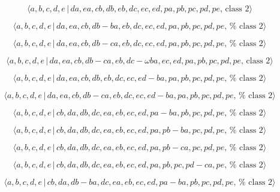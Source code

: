 \documentclass[10pt]{article}
\begin{document}
\begin{equation}
\langle a,b,c,d,e\,|\,da,ea,cb,db,eb,dc,ec,ed,pa,pb,pc,pd,pe,\,\text{class }%
2\rangle  \tag{7.4590}
\end{equation}

\begin{equation}
\langle a,b,c,d,e\,|\,da,ea,cb,db-ba,eb,dc,ec,ed,pa,pb,pc,pd,pe,\,\text{%
class }2\rangle  \tag{7.4591}
\end{equation}

\begin{equation}
\langle a,b,c,d,e\,|\,da,ea,cb,db-ca,eb,dc,ec,ed,pa,pb,pc,pd,pe,\,\text{%
class }2\rangle  \tag{7.4592}
\end{equation}

\begin{equation}
\langle a,b,c,d,e\,|\,da,ea,cb,db-ca,eb,dc-\omega ba,ec,ed,pa,pb,pc,pd,pe,\,%
\text{class }2\rangle  \tag{7.4593}
\end{equation}

\begin{equation}
\langle a,b,c,d,e\,|\,da,ea,cb,db,eb,dc,ec,ed-ba,pa,pb,pc,pd,pe,\,\text{%
class }2\rangle  \tag{7.4594}
\end{equation}

\begin{equation}
\langle a,b,c,d,e\,|\,da,ea,cb,db-ca,eb,dc,ec,ed-ba,pa,pb,pc,pd,pe,\,\text{%
class }2\rangle  \tag{7.4595}
\end{equation}

\begin{equation}
\langle a,b,c,d,e\,|\,cb,da,db,dc,ea,eb,ec,ed,pa-ba,pb,pc,pd,pe,\,\text{%
class }2\rangle  \tag{7.4596}
\end{equation}

\begin{equation}
\langle a,b,c,d,e\,|\,cb,da,db,dc,ea,eb,ec,ed,pa,pb-ba,pc,pd,pe,\,\text{%
class }2\rangle  \tag{7.4597}
\end{equation}

\begin{equation}
\langle a,b,c,d,e\,|\,cb,da,db,dc,ea,eb,ec,ed,pa,pb-ca,pc,pd,pe,\,\text{%
class }2\rangle  \tag{7.4598}
\end{equation}

\begin{equation}
\langle a,b,c,d,e\,|\,cb,da,db,dc,ea,eb,ec,ed,pa,pb,pc,pd-ca,pe,\,\text{%
class }2\rangle  \tag{7.4599}
\end{equation}

\begin{equation}
\langle a,b,c,d,e\,|\,cb,da,db-ba,dc,ea,eb,ec,ed,pa-ba,pb,pc,pd,pe,\,\text{%
class }2\rangle  \tag{7.4600}
\end{equation}
\end{document}
